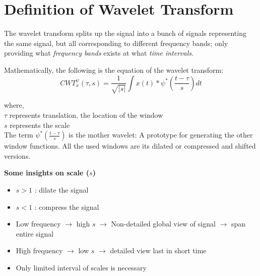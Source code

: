 \section{Definition of Wavelet Transform}

The wavelet transform splits up the signal into a bunch of signals
representing the same signal, but all corresponding to different frequency bands; only providing what \emph{frequency bands} exists at what \emph{time intervals}. 

Mathematically, the following is the equation of the wavelet transform: \\  
$$ CWT_x^{\psi}(\tau, s) = \frac{1}{\sqrt{|s|}}\int x(t)*\psi^*(\frac{t - \tau}{s})dt $$

where, \\ 
$\tau$ represents translation, the location of the window \\ 
$s$ represents the scale \\ 
The term $\psi^*(\frac{t - \tau}{s})$ is the mother wavelet: A prototype for generating the other window functions. All the used windows are its dilated or compressed and shifted versions. 

\textbf{Some insights on scale ($s$)} \\ 
\vspace{-0.4in}
\begin{itemize}
\itemsep-1em
\item $s>1$ : dilate the signal
\item $s<1$ : compress the signal
\item Low frequency $\rightarrow$ high $s$ $\rightarrow$ Non-detailed global view of signal $\rightarrow$ span entire signal
\item High frequency $\rightarrow$ low $s$ $\rightarrow$ detailed view last in short time
\item Only limited interval of scales is necessary
\end{itemize}


